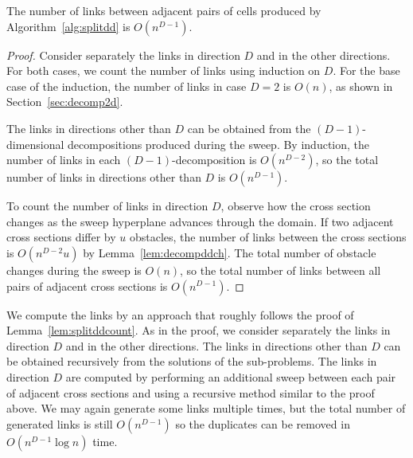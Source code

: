 \documentclass[english,gradu]{tktltiki2018}
\begin{document}
\begin{lem}\label{lem:splitddcount}The number of links between adjacent pairs of cells produced by Algorithm~\ref{alg:splitdd} is $O(n^{D-1})$.\end{lem}
\begin{proof}
Consider separately the links in direction $D$ and in the other directions.
For both cases, we count the number of links using induction on $D$.
For the base case of the induction, the number of links in case $D=2$ is $O(n)$, as shown in Section~\ref{sec:decomp2d}.

The links in directions other than $D$ can be obtained from the $(D-1)$-dimensional decompositions produced during the sweep.
By induction, the number of links in each $(D-1)$-decomposition is $O(n^{D-2})$, so the total number of links in directions other than $D$ is $O(n^{D-1})$.

To count the number of links in direction $D$, observe how the cross section changes as the sweep hyperplane advances through the domain.
If two adjacent cross sections differ by $u$ obstacles, the number of links between the cross sections is $O(n^{D-2}u)$ by Lemma~\ref{lem:decompddch}.
The total number of obstacle changes during the sweep is $O(n)$, so the total number of links between all pairs of adjacent cross sections is $O(n^{D-1})$.
\end{proof}

We compute the links by an approach that roughly follows the proof of Lemma~\ref{lem:splitddcount}.
As in the proof, we consider separately the links in direction $D$ and in the other directions.
The links in directions other than $D$ can be obtained recursively from the solutions of the sub-problems.
The links in direction $D$ are computed by performing an additional sweep between each pair of adjacent cross sections and using a recursive method similar to the proof above.
We may again generate some links multiple times, but the total number of generated links is still $O(n^{D-1})$ so the duplicates can be removed in $O(n^{D-1}\log n)$ time.
\end{document}
